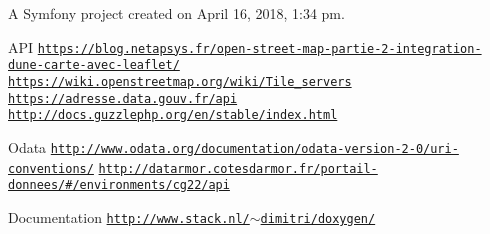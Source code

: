 A Symfony project created on April 16, 2018, 1\+:34 pm.

A\+PI \href{https://blog.netapsys.fr/open-street-map-partie-2-integration-dune-carte-avec-leaflet/}{\tt https\+://blog.\+netapsys.\+fr/open-\/street-\/map-\/partie-\/2-\/integration-\/dune-\/carte-\/avec-\/leaflet/} \href{https://wiki.openstreetmap.org/wiki/Tile_servers}{\tt https\+://wiki.\+openstreetmap.\+org/wiki/\+Tile\+\_\+servers} \href{https://adresse.data.gouv.fr/api}{\tt https\+://adresse.\+data.\+gouv.\+fr/api} \href{http://docs.guzzlephp.org/en/stable/index.html}{\tt http\+://docs.\+guzzlephp.\+org/en/stable/index.\+html}

Odata \href{http://www.odata.org/documentation/odata-version-2-0/uri-conventions/}{\tt http\+://www.\+odata.\+org/documentation/odata-\/version-\/2-\/0/uri-\/conventions/} \href{http://datarmor.cotesdarmor.fr/portail-donnees/#/environments/cg22/api}{\tt http\+://datarmor.\+cotesdarmor.\+fr/portail-\/donnees/\#/environments/cg22/api}

Documentation \href{http://www.stack.nl/~dimitri/doxygen/}{\tt http\+://www.\+stack.\+nl/$\sim$dimitri/doxygen/} 